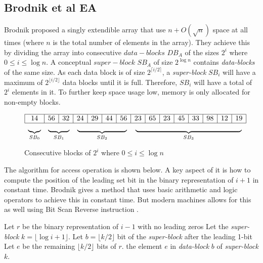 \subsection{Brodnik et al EA}
Brodnik \cite{Brodnik_1999} proposed a singly extendible array that use $n + O(\sqrt{n})$ space at all times (where $n$ is the total number of elements in the array). They achieve this by dividing the array into consecutive $data-blocks$ $DB_A$ of the sizes $2^i$ where $0 \leq i \leq \log n$. A conceptual $super-block$ $SB_A$ of size $2^{\log n}$ contains \textit{data-blocks} of the same size. As each data block is of size $2^{\lceil i/2 \rceil}$, a \textit{super-block} $SB_i$ will have a maximum of $2^{\lfloor i/2 \rfloor}$ data blocks until it is full. Therefore, $SB_i$ will have a total of $2^i$ elements in it. To further keep space usage low, memory is only allocated for non-empty blocks.
\begin{figure}[H]
    \centering
   \[\begin{array}{|c|c|c|c|c|c|c|c|c|c|c|c|c|c|c|c|}\hline
14 & 56 & 32 & 24 & 29 & 44 & 56 & 23 & 65 & 23 & 45 & 33 & 98 & 12 & 19\\ \hline
\multicolumn{1}{c}{\underbrace{\hphantom{14}}_{\text{$SB_0$}}} &
\multicolumn{2}{c}{\underbrace{\hphantom{56 \quad 32}}_{\text{$SB_1$}}} &
\multicolumn{4}{c}{\underbrace{\hphantom{24 \quad 29 \quad 44 \quad 56 }}_{\text{$SB_2$}}} &
\multicolumn{8}{c}{\underbrace{\hphantom{23 \quad 65 \quad 23 \quad 45 \quad 33 \quad 98 \quad 12 \quad 19}}_{\text{$SB_3$}}} \\
\end{array}\]
    \caption{Consecutive blocks of $2^i$ where $0 \leq i \leq \log n$}
    \label{fig:brodnik-blocks}
\end{figure}
The algorithm for access operation is shown below. A key aspect of it is how to compute the position of the leading set bit in the binary representation of $i+1$ in constant time. Brodnik \cite{Brodnik_1993} gives a method that uses basic arithmetic and logic operators to achieve this in constant time. But modern machines allows for this as well using Bit Scan Reverse instruction \cite{intel_bsr}.\par
\begin{table}[ht]
    \centering
    \begin{minipage}[t]{1\textwidth}
        \centering
        \begin{algorithm}[H]
            \caption{Access(i)}
            \begin{algorithmic}[1]
                \STATE Let $r$ be the binary representation of $i-1$ with no leading zeros
                \STATE Let the \textit{super-block} $k = \lfloor \log i+1 \rfloor$.
                \STATE Let $b = \lfloor k/2 \rfloor$ bit of the \textit{super-block} after the leading 1-bit
                \STATE Let $e$ be the remaining $\lfloor k/2 \rfloor$ bits of $r$.
                \RETURN the element $e$ in \textit{data-block} $b$ of \textit{super-block} $k$.
            \end{algorithmic}
        \end{algorithm}
    \end{minipage}%
\end{table}
